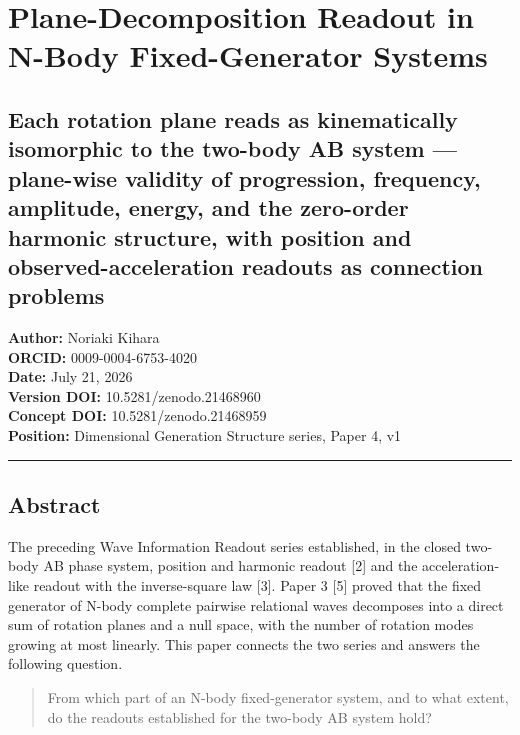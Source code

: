 \documentclass[
  a4paper,
]{article}
\author{}
\date{}
\begin{document}
\section{Plane-Decomposition Readout in N-Body Fixed-Generator
Systems}\label{plane-decomposition-readout-in-n-body-fixed-generator-systems}

\subsection{Each rotation plane reads as kinematically isomorphic to the
two-body AB system --- plane-wise validity of progression, frequency,
amplitude, energy, and the zero-order harmonic structure, with position
and observed-acceleration readouts as connection
problems}\label{each-rotation-plane-reads-as-kinematically-isomorphic-to-the-two-body-ab-system-plane-wise-validity-of-progression-frequency-amplitude-energy-and-the-zero-order-harmonic-structure-with-position-and-observed-acceleration-readouts-as-connection-problems}

\textbf{Author:} Noriaki Kihara\\
\textbf{ORCID:} 0009-0004-6753-4020\\
\textbf{Date:} July 21, 2026\\
\textbf{Version DOI:} 10.5281/zenodo.21468960\\
\textbf{Concept DOI:} 10.5281/zenodo.21468959\\
\textbf{Position:} Dimensional Generation Structure series, Paper 4, v1

\begin{center}\rule{0.5\linewidth}{0.5pt}\end{center}

\subsection{Abstract}\label{abstract}

The preceding Wave Information Readout series established, in the closed
two-body AB phase system, position and harmonic readout {[}2{]} and the
acceleration-like readout with the inverse-square law {[}3{]}. Paper 3
{[}5{]} proved that the fixed generator of N-body complete pairwise
relational waves decomposes into a direct sum of rotation planes and a
null space, with the number of rotation modes growing at most linearly.
This paper connects the two series and answers the following question.

\begin{quote}
From which part of an N-body fixed-generator system, and to what extent,
do the readouts established for the two-body AB system hold?
\end{quote}
\end{document}
